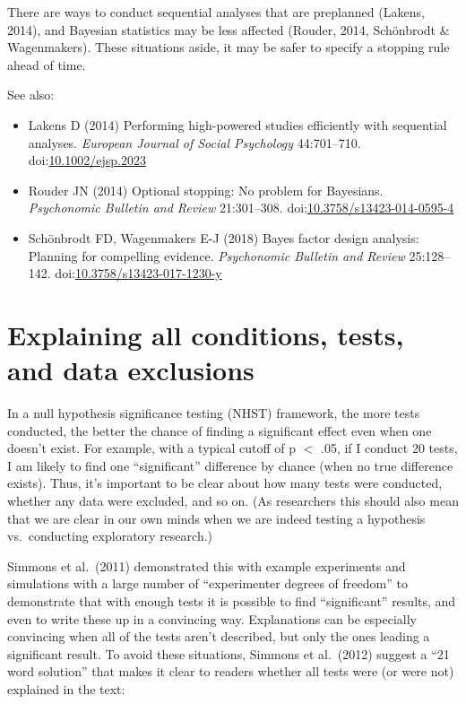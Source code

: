 \documentclass[letterpaper,oneside,11pt,article, portrait]{memoir}
\newcommand{\doi}[1]{doi:\href{http://dx.doi.org/#1}{#1}}
\newcommand{\journal}[1]{\textit{#1}} 			%
\begin{document}
There are ways to conduct sequential analyses that are preplanned (Lakens, 2014), and Bayesian statistics may be less affected (Rouder, 2014, Sch\"onbrodt \& Wagenmakers). These situations aside, it may be safer to specify a stopping rule ahead of time.

\vspace{1em} \noindent See also:

\begin{itemize}
\item Lakens D (2014) Performing high-powered studies efficiently with sequential analyses. \journal{European Journal of Social Psychology} 44:701--710. \doi{10.1002/ejsp.2023}

\item Rouder JN (2014) Optional stopping: No problem for Bayesians. \journal{Psychonomic Bulletin and Review} 21:301--308. \doi{10.3758/s13423-014-0595-4}

\item Sch\"onbrodt FD, Wagenmakers E-J (2018) Bayes factor design analysis: Planning for compelling evidence. \journal{Psychonomic Bulletin and Review} 25:128--142. \doi{10.3758/s13423-017-1230-y}

\end{itemize}



\chapter{Explaining all conditions, tests, and data exclusions} \label{explainAllTests}

In a null hypothesis significance testing (NHST) framework, the more tests conducted, the better the chance of finding a significant effect even when one doesn't exist. For example, with a typical cutoff of p $<$ .05, if I conduct 20 tests, I am likely to find one ``significant'' difference by chance (when no true difference exists). Thus, it's important to be clear about how many tests were conducted, whether any data were excluded, and so on. (As researchers this should also mean that we are clear in our own minds when we are indeed testing a hypothesis vs.\ conducting exploratory research.)

Simmons et al.\ (2011) demonstrated this with example experiments and simulations with a large number of ``experimenter degrees of freedom'' to demonstrate that with enough tests it is possible to find ``significant'' results, and even to write these up in a convincing way. Explanations can be especially convincing when all of the tests aren't described, but only the ones leading a significant result. To avoid these situations, Simmons et al.\ (2012) suggest a ``21 word solution'' that makes it clear to readers whether all tests were (or were not) explained in the text:
\end{document}
